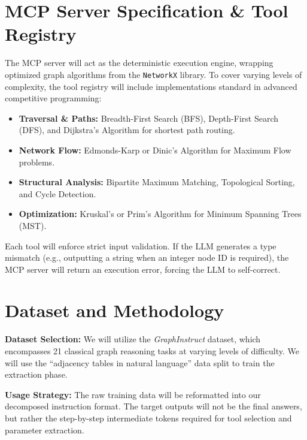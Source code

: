 \documentclass[11pt,a4paper]{article}
\begin{document}
\section{MCP Server Specification \& Tool Registry}
The MCP server will act as the deterministic execution engine, wrapping optimized graph algorithms from the \texttt{NetworkX} library. To cover varying levels of complexity, the tool registry will include implementations standard in advanced competitive programming:
\begin{itemize}
    \item \textbf{Traversal \& Paths:} Breadth-First Search (BFS), Depth-First Search (DFS), and Dijkstra’s Algorithm for shortest path routing.
    \item \textbf{Network Flow:} Edmonds-Karp or Dinic's Algorithm for Maximum Flow problems.
    \item \textbf{Structural Analysis:} Bipartite Maximum Matching, Topological Sorting, and Cycle Detection.
    \item \textbf{Optimization:} Kruskal’s or Prim’s Algorithm for Minimum Spanning Trees (MST).
\end{itemize}
Each tool will enforce strict input validation. If the LLM generates a type mismatch (e.g., outputting a string when an integer node ID is required), the MCP server will return an execution error, forcing the LLM to self-correct.

\section{Dataset and Methodology}
 \textbf{Dataset Selection:} We will utilize the \textit{GraphInstruct} dataset, which encompasses 21 classical graph reasoning tasks at varying levels of difficulty. We will use the ``adjacency tables in natural language'' data split to train the extraction phase.

 \textbf{Usage Strategy:} The raw training data will be reformatted into our decomposed instruction format. The target outputs will not be the final answers, but rather the step-by-step intermediate tokens required for tool selection and parameter extraction. 
\end{document}
